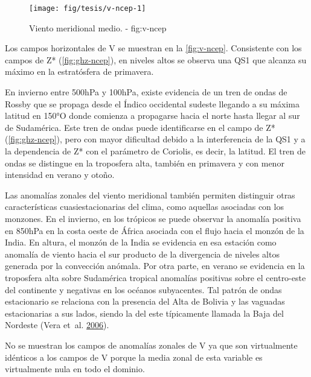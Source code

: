\documentclass[spanish,a4paper]{book}
\begin{document}
\begin{landscape}\begin{figure}

{\centering \texttt{[image: fig/tesis/v-ncep-1]} 

}

\caption{Viento meridional medio. - fig:v-ncep}\label{fig:v-ncep}
\end{figure}
\end{landscape}

Los campos horizontales de V se muestran en la \autoref{fig:v-ncep}.
Consistente con los campos de Z* (\autoref{fig:ghz-ncep}), en niveles
altos se observa una QS1 que alcanza su máximo en la estratósfera de
primavera.

En invierno entre 500hPa y 100hPa, existe evidencia de un tren de ondas
de Rossby que se propaga desde el Índico occidental sudeste llegando a
su máxima latitud en 150°O donde comienza a propagarse hacia el norte
hasta llegar al sur de Sudamérica. Este tren de ondas puede
identificarse en el campo de Z* (\autoref{fig:ghz-ncep}), pero con mayor
dificultad debido a la interferencia de la QS1 y a la dependencia de Z*
con el parámetro de Coriolis, es decir, la latitud. El tren de ondas se
distingue en la troposfera alta, también en primavera y con menor
intensidad en verano y otoño.

Las anomalías zonales del viento meridional también permiten distinguir
otras características cuasiestacionarias del clima, como aquellas
asociadas con los monzones. En el invierno, en los trópicos se puede
observar la anomalía positiva en 850hPa en la costa oeste de África
asociada con el flujo hacia el monzón de la India. En altura, el monzón
de la India se evidencia en esa estación como anomalía de viento hacia
el sur producto de la divergencia de niveles altos generada por la
convección anómala. Por otra parte, en verano se evidencia en la
troposfera alta sobre Sudamérica tropical anomalías positivas sobre el
centro-este del continente y negativas en los océanos subyacentes. Tal
patrón de ondas estacionario se relaciona con la presencia del Alta de
Bolivia y las vaguadas estacionarias a sus lados, siendo la del este
típicamente llamada la Baja del Nordeste (Vera et~al.
\protect\hyperlink{ref-Vera2006}{2006}).

No se muestran los campos de anomalías zonales de V ya que son
virtualmente idénticos a los campos de V porque la media zonal de esta
variable es virtualmente nula en todo el dominio.

\begin{landscape}\end{landscape}
\end{document}
